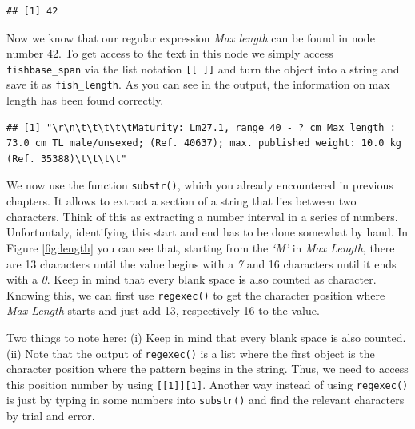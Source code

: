 \documentclass[
]{book}
\newenvironment{Shaded}{\begin{snugshade}}{\end{snugshade}}
\newcommand{\KeywordTok}[1]{\textcolor[rgb]{0.13,0.29,0.53}{\textbf{#1}}}
\newcommand{\NormalTok}[1]{#1}
\newcommand{\OperatorTok}[1]{\textcolor[rgb]{0.81,0.36,0.00}{\textbf{#1}}}
\newcommand{\StringTok}[1]{\textcolor[rgb]{0.31,0.60,0.02}{#1}}
\begin{document}
\begin{verbatim}
## [1] 42
\end{verbatim}

Now we know that our regular expression \emph{Max length} can be found in node number 42. To get access to the text in this node we simply access \texttt{fishbase\_span} via the list notation \texttt{{[}{[}\ {]}{]}} and turn the object into a string and save it as \texttt{fish\_length}. As you can see in the output, the information on max length has been found correctly.

\begin{Shaded}
\end{Shaded}

\begin{verbatim}
## [1] "\r\n\t\t\t\t\tMaturity: Lm27.1, range 40 - ? cm Max length : 73.0 cm TL male/unsexed; (Ref. 40637); max. published weight: 10.0 kg (Ref. 35388)\t\t\t\t"
\end{verbatim}

We now use the function \texttt{substr()}, which you already encountered in previous chapters. It allows to extract a section of a string that lies between two characters. Think of this as extracting a number interval in a series of numbers. Unfortuntaly, identifying this start and end has to be done somewhat by hand. In Figure \ref{fig:length} you can see that, starting from the \emph{`M'} in \emph{Max Length}, there are 13 characters until the value begins with a \emph{7} and 16 characters until it ends with a \emph{0}. Keep in mind that every blank space is also counted as character. Knowing this, we can first use \texttt{regexec()} to get the character position where \emph{Max Length} starts and just add 13, respectively 16 to the value.

Two things to note here: (i) Keep in mind that every blank space is also counted. (ii) Note that the output of \texttt{regexec()} is a list where the first object is the character position where the pattern begins in the string. Thus, we need to access this position number by using \texttt{{[}{[}1{]}{]}{[}1{]}}. Another way instead of using \texttt{regexec()} is just by typing in some numbers into \texttt{substr()} and find the relevant characters by trial and error.
\end{document}
